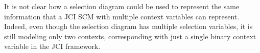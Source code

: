 \documentclass[twoside,11pt]{article}
\newcommand{\Joris}[1]{{\color{blue}#1}}
\newcommand{\Sara}[1]{{\color{purple}#1}}
\begin{document}
It is not clear how a selection diagram could be used to represent the same information that a JCI SCM with multiple context variables can represent.
Indeed, even though the selection diagram has multiple selection variables, it is still modeling only two contexts, corresponding with just a single binary context variable in the JCI framework.

\end{document}
